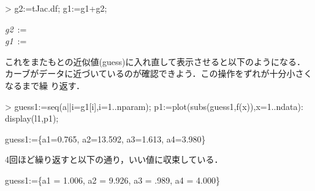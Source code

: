 \begin{MapleInput}
> g2:=tJac.df; 
  g1:=g1+g2;
\end{MapleInput}
\begin{MapleOutputGather}
{\it g2}\, := \, \left[ \begin {array}{c} - 0.235\\  5.592\\  0.613\\ - 0.520\end {array} \right]  \notag \\
{\it g1}\, := \, \left[ \begin {array}{c}  0.765\\  13.592\\  1.613\\  3.980\end {array} \right] \notag
\end{MapleOutputGather}
これをまたもとの近似値(guess)に入れ直して表示させると以下のようになる．カーブがデータに近づいているのが確認できよう．この操作をずれが十分小さくなるまで繰
り返す．
\begin{MapleInput}
> guess1:={seq(a||i=g1[i],i=1..nparam)};
  p1:=plot(subs(guess1,f(x)),x=1..ndata):
  display(l1,p1);
\end{MapleInput}
\begin{MapleOutput}
guess1:=\{a1=0.765, a2=13.592, a3=1.613, a4=3.980\}
\end{MapleOutput}

4回ほど繰り返すと以下の通り，いい値に収束している．
\begin{MapleOutput}
guess1:=\{a1 = 1.006, a2 = 9.926, a3 = .989, a4 = 4.000\}
\end{MapleOutput}

